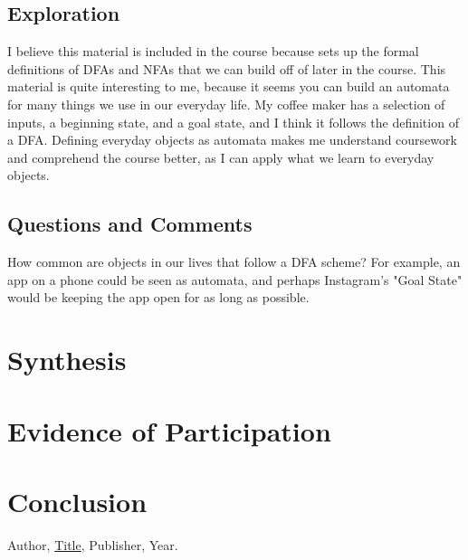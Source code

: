 \documentclass{article}
\theoremstyle{theorem}
\theoremstyle{definition}
\theoremstyle{remark}
\begin{document}
\subsection{Exploration}
I believe this material is included in the course because sets up the formal definitions of DFAs and NFAs that we can build off of later in the course. This material is quite interesting to me, because it seems you can build an automata for many things we use in our everyday life. My coffee maker has a selection of inputs, a beginning state, and a goal state, and I think it follows the definition of a DFA. Defining everyday objects as automata makes me understand coursework and comprehend the course better, as I can apply what we learn to everyday objects.

\subsection{Questions and Comments}
How common are objects in our lives that follow a DFA scheme? For example, an app on a phone could be seen as automata, and perhaps Instagram's "Goal State" would be keeping the app open for as long as possible.
\section{Synthesis}

\section{Evidence of Participation}

\section{Conclusion}\label{conclusion}

\begin{thebibliography}{99}
 Author, \href{https://en.wikipedia.org/wiki/LaTeX}{Title}, Publisher, Year.
\end{thebibliography}
\end{document}

